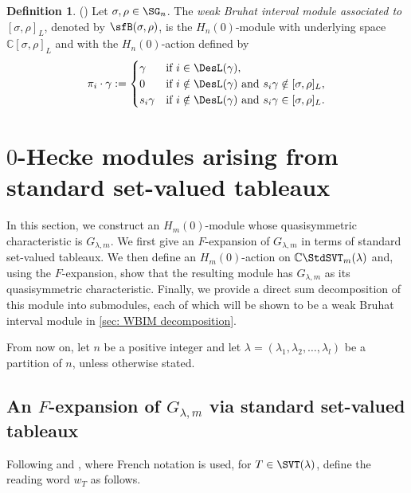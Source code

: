 \documentclass[12pt, reqno]{amsart}
\numberwithin{equation}{section}
\numberwithin{figure}{section}
\numberwithin{table}{section}
\theoremstyle{definition}
\newtheorem{definition}[theorem]{Definition}
\def\C{\mathbb C}
\begin{document}
\begin{definition}\label{def: weak bruhat interval module}(\cite[Definition 1]{JKLO22})
Let $\sigma,\rho \in \SG_n$.
The \emph{weak Bruhat interval module associated to $[\sigma,\rho]_L$}, denoted by $\sfB(\sigma,\rho)$, is the $H_n(0)$-module with underlying space $\C[\sigma,\rho]_L$ and with the $H_n(0)$-action defined by
\[
\pi_i\cdot \gamma:=
\begin{cases}
\gamma & \text{if $i \in \DesL(\gamma)$},\\
0 & \text{if $i \notin \DesL(\gamma)$ and $s_i\gamma \notin [\sigma,\rho]_L$},\\
s_i\gamma & \text{if $i \notin \DesL(\gamma)$ and $s_i\gamma \in [\sigma,\rho]_L$.}
\end{cases}
\]
\end{definition}



\section[0-Hecke modules arising from standard set-valued tableaux]
{$0$-Hecke modules arising from standard set-valued tableaux}
\label{sec: svt action}


In this section, we construct an $H_m(0)$-module whose quasisymmetric characteristic is $G_{\lambda,m}$.
We first give an $F$-expansion of $G_{\lambda,m}$ in terms of standard set-valued tableaux.
We then define an $H_m(0)$-action on $\C\StdSVT_m(\lambda)$ and, using the $F$-expansion, show that the resulting module has $G_{\lambda,m}$ as its quasisymmetric characteristic.
Finally, we provide a direct sum decomposition of this module into submodules, each of which will be shown to be a weak Bruhat interval module in \cref{sec: WBIM decomposition}.


From now on, let $n$ be a positive integer and let $\lambda = (\lambda_1, \lambda_2, \ldots, \lambda_l)$ be a partition of $n$, unless otherwise stated.

\subsection[An F-expansion via standard set-valued tableaux]{An $F$-expansion of $G_{\lambda,m}$ via standard set-valued tableaux}


Following \cite[Definition~3.1]{BM12} and \cite[Definition~4.1]{PPPS22}, where French notation is used, for $T \in \SVT(\lambda)$, define the reading word $w_T$ as follows.
\end{document}
